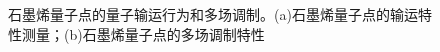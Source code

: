     \begin{figure}[htb]
        \caption{石墨烯量子点的量子输运行为和多场调制。(a)石墨烯量子点的输运特性测量；(b)石墨烯量子点的多场调制特性}
        \label{fig:intro_graphene-quandot}
    \end{figure}

